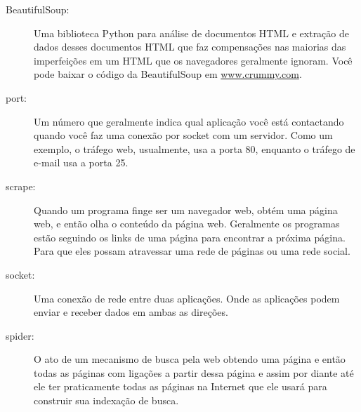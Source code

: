 \begin{description}

\item[BeautifulSoup:] Uma biblioteca Python para análise de documentos HTML
e extração de dados desses documentos HTML que faz compensações nas
maiorias das imperfeições em um HTML que os navegadores geralmente ignoram.
Você pode baixar o código da BeautifulSoup em 
\url{www.crummy.com}.

\item[port:] Um número que geralmente indica qual aplicação 
você está contactando quando você faz uma conexão por socket com um servidor.
Como um exemplo, o tráfego web, usualmente, usa a porta 80, enquanto o
tráfego de e-mail usa a porta 25.

\item[scrape:] Quando um programa finge ser um navegador web,
obtém uma página web, e então olha o conteúdo da página web. 
Geralmente os programas estão seguindo os links de uma página para
encontrar a próxima página. Para que eles possam atravessar uma rede de páginas
ou uma rede social.

\item[socket:] Uma conexão de rede entre duas aplicações. Onde as
aplicações podem enviar e receber dados em ambas as direções.

\item[spider:] O ato de um mecanismo de busca pela web obtendo uma
página e então todas as páginas com ligações a partir dessa página e
assim por diante até ele ter praticamente todas as páginas na Internet que
ele usará para construir sua indexação de busca.

\end{description}
